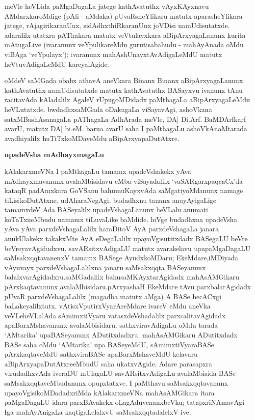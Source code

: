 meVle heVLida paMgaDagaLa jatege kathAvatuthx vAyxKAyxnavu AMdarxkaroMdige (pAli - aMdaka) pUvaRsheYlikaru matutx aparasheYlikara jatege, rAjagirikaranUnx, sidAdhxthiRkaranUnx joVDisi namUdisutatxde. adaralilx utatxra pAThakara matutx veVtulayxkara aBipArxyagaLanunx kurita mAtugaLive (ivaranunx veYpulikareMdu gurutisabahudu - mahAyAnada oMdu viBAga `veYpulayx'); ivaranunx mahAshUnayxtAvAdigaLeMdU matutx heVtuvAdigaLeMdU kareyalAgide.

oMdeV saMGada obabx athavA aneVkara Binanx Binanx aBipArxyagaLanunx kathAvatuthx namUdisutatxde matutx kathAvatuthx BASayxvu ivanunx tAnu racitavAda kAladalilx AgaleV rUpugoMDidadx paMthagaLa aBipArxyagaLeMdu heVLutatxde. bwdadhxsaMGada oDakugaLa viSayavAgi, ashoVkana satxMBashAsanagaLa pAThagaLa AdhArada meVle, DA| Di.Arf. BaMDArfkarf avarU, matutx DA| bi.eM. barua avarU saha I paMthagaLu ashoVkAnaMtarada avadhiyalilx huTiTxkoMDaveMdu aBipArxyapaDutAtxre.

\begin{center}
{\textbf{\Large upadeVsha mAdhayxmagaLu}}
\end{center}

kAlakarxmeVNa I paMthagaLu tamamx upadeVshakekx yAva mAdhayxmavanunx avalaMbisi\-davu eMba viSayadalilx `vaSARgarxpaqcaCx'da kataqR padAmxkara GoVSanu bahumuKayx\-vAda saMgatiyoMdanunx namage tiLisikoDutAtxne. udAharaNegAgi, budadhxnu tananx anu\-yAyigaLige tamamxdeV Ada BASeyalilx upadeVshagaLanunx heVLalu anumati koTaTx\break\-neMbudu namamx tiLuvaLike baMdide. hiVge budadhxna upadeVsha yAva yAva parxdeVsha\-gaLalilx haraDitoV AyA parxdeVshagaLa janara anukUlakekx takakxMte AyA eDegaLalilx upa\-yoVgisutitxdadx BASegaLU beVre beVreyavAgidudxvu. savARsitxvAdigaLU matutx avara\break kelavu upapaMgaDagaLU saMsakxqqtavanenxV tamamx BASege AyudxkoMDaru; EkeMdare,\break iMDiyada vAyuvayx parxdeVshagaLalilxna janaru saMsakxqqta BASeyanunx balalxvarAgidadxru.\break saMGadalilx bahusaMKAyxtarAgidadx mahAsAMGikaru pArxkaqtavanunx avalaMbisidaru.\break pArxyashaH EkeMdare tAvu parxbalarAgidadx pUvaR parxdeVshagaLalilx (magadha matutx aMga) A BASe hecACxgi baLakeyalilxtutx. vAtisxVputirxVyarAreMdare ivareV eMdu aneVka veVLe\break heVLalAda sAmimxtiVyaru vatasxdeVshadalilx parxcalitavAgidadx apaBarxMshavanunx avalaMbi\-si\-daru. sathxviravAdigaLu oMdu tarada `AMtarika' upaBASeyanunx ADutitxdadxru. mahA\-sAMGikaru ADutitxdadx BASe saha oMdu `AMtarika' upa BASeyeMdU, sAmimxtiVyara\break BASe pArxkaqtaveMdU sathxviraBASe apaBarxMshaveMdU kelavaru aBipArxyapaDutAtxre\break eMbudU saha ukatxvAgide. Adare parasapxra virudadhxvAda iveraDU mUlagaLU savARsitxvAdigaLu avalaMbisida BASe saMsakxqqtaveMbudanunx opupxtatxve. I paMthavu saMsakxqqta\-vanunx upayoVgisikoMDadadxriMda kAlakarxmeVNa mahAsAMGikara itara paMgaDagaLU idara parxBAvakekx oLagAduvenanxbeVku; tatapxriNAmavAgi Iga mahAyAnigaLa kaqtigaLe\-lalxvU saMsakxqqtadalelxV ive.

